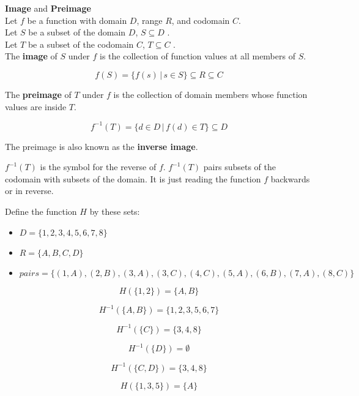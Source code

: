 \documentclass{ximera}
\begin{document}
\begin{definition} \textbf{\textcolor{green!50!black}{Image}} and \textbf{\textcolor{green!50!black}{Preimage}} \\


Let $f$ be a function with domain $D$, range $R$, and codomain $C$. \\
Let $S$ be a subset of the domain $D$, $S \subseteq D$ . \\
Let $T$ be a subset of the codomain $C$, $T \subseteq C$ . \\


The \textbf{image} of $S$ under $f$ is the collection of function values at all members of $S$.

\[
f(S) = \{ f(s) \, | \, s \in S   \} \subseteq R \subseteq C
\]




The \textbf{preimage} of $T$ under $f$ is the collection of domain members whose function values are inside $T$.

\[
f^{-1}(T) = \{ d \in D \, | \, f(d) \in T  \} \subseteq D
\]


The preimage is also known as the \textbf{inverse image}.

$f^{-1}(T)$ is the symbol for the reverse of $f$. $f^{-1}(T)$ pairs subsets of the codomain with subsets of the domain.  It is just reading the function $f$ backwards or in reverse.



\end{definition}









\begin{example}


Define the function $H$ by these sets: \\

\begin{itemize}
	\item  $D = \{ 1, 2, 3, 4, 5, 6, 7, 8 \}$
	\item  $R = \{ A, B, C, D \}$
	\item  $pairs = \{ (1, A), (2, B), (3, A), (3, C), (4, C), (5, A), (6, B), (7, A), (8, C)    \}$
\end{itemize}


\[  H(\{ 1, 2 \}) = \{ A, B \}  \]

\[  H^{-1}(\{ A, B \}) = \{ 1, 2, 3, 5, 6, 7 \}  \]

\[  H^{-1}(\{ C \}) = \{ 3, 4, 8 \}  \]

\[  H^{-1}(\{ D \}) = \emptyset  \]

\[  H^{-1}(\{ C, D \}) = \{ 3, 4, 8 \}  \]

\[  H(\{ 1, 3, 5 \}) = \{ A \}  \]


\end{example}
\end{document}
